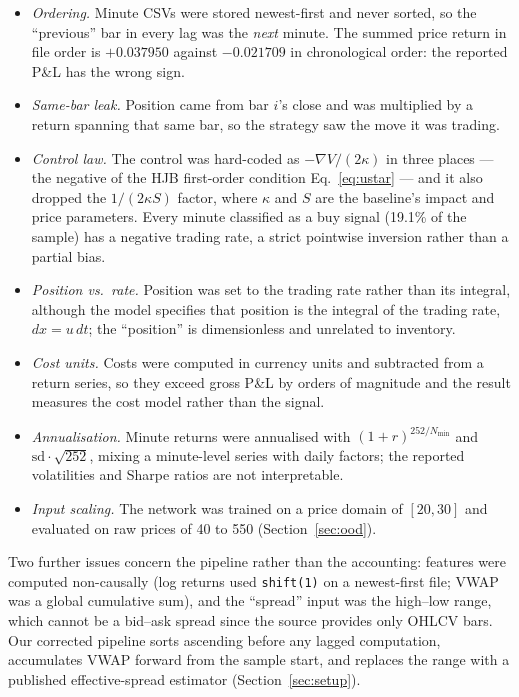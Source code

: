 \documentclass[conference]{IEEEtran}
\begin{document}
\begin{itemize}\itemsep1pt
\item[\textbf{D1}] \emph{Ordering.} Minute CSVs were stored newest-first and never sorted, so the
``previous'' bar in every lag was the \emph{next} minute. The summed price return in file order is
$+0.037950$ against $-0.021709$ in chronological order: the reported P\&L has the wrong sign.
\item[\textbf{D2}] \emph{Same-bar leak.} Position came from bar $i$'s close and was multiplied by
a return spanning that same bar, so the strategy saw the move it was trading.
\item[\textbf{D3/D4}] \emph{Control law.} The control was hard-coded as $-\nabla V/(2\kappa)$ in
three places --- the negative of the HJB first-order condition Eq.~\eqref{eq:ustar} --- and it also
dropped the $1/(2\kappa S)$ factor, where $\kappa$ and $S$ are the baseline's impact and price
parameters. Every minute classified as a buy signal (19.1\% of the sample)
has a negative trading rate, a strict pointwise inversion rather than a partial bias.
\item[\textbf{D5}] \emph{Position vs.\ rate.} Position was set to the trading rate rather than its
integral, although the model specifies that position is the integral of the trading rate,
$dx = u\,dt$; the ``position'' is dimensionless and unrelated to inventory.
\item[\textbf{D6}] \emph{Cost units.} Costs were computed in currency units and subtracted from a
return series, so they exceed gross P\&L by orders of magnitude and the result measures the cost
model rather than the signal.
\item[\textbf{D7}] \emph{Annualisation.} Minute returns were annualised with
$(1+r)^{252/N_{\text{min}}}$ and $\mathrm{sd}\cdot\sqrt{252}$, mixing a minute-level series with
daily factors; the reported volatilities and Sharpe ratios are not interpretable.
\item[\textbf{D8}] \emph{Input scaling.} The network was trained on a price domain of $[20,30]$
and evaluated on raw prices of 40 to 550 (Section~\ref{sec:ood}).
\end{itemize}

Two further issues concern the pipeline rather than the accounting: features were computed
non-causally (log returns used \texttt{shift(1)} on a newest-first file; VWAP was a global
cumulative sum), and the ``spread'' input was the high--low range, which cannot be a bid--ask
spread since the source provides only OHLCV bars. Our corrected pipeline sorts ascending before
any lagged computation, accumulates VWAP forward from the sample start, and replaces the range
with a published effective-spread estimator (Section~\ref{sec:setup}).
\end{document}
